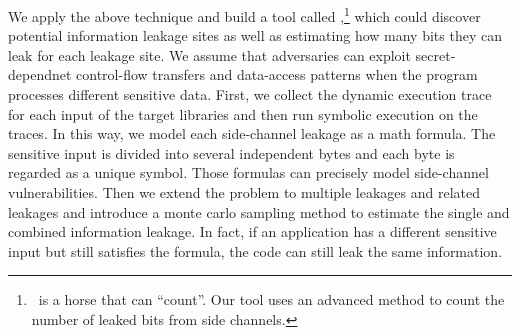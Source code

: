 We apply the above technique and build a tool called \tool{},\footnote{\tool\ is a horse that can ``count''.
Our tool uses an advanced method to count the number of leaked bits from side channels.}
which could discover potential information leakage sites 
as well as estimating how many bits they can leak for each leakage site. 
We assume that adversaries can exploit secret-dependnet control-flow transfers and 
data-access patterns when the program processes different sensitive data. 
First, we collect the dynamic execution trace for each input of the target libraries 
and then run symbolic execution on the traces. 
In this way, we model each side-channel leakage as a math formula. 
The sensitive input is divided into several independent bytes and each byte is regarded as 
a unique symbol. Those formulas can precisely model side-channel vulnerabilities.
Then we extend the problem to multiple leakages and related leakages
and introduce a monte carlo sampling method to estimate the single and combined information leakage.
In fact, if an application has a different sensitive input but still satisfies the formula, 
the code can still leak the same information. 





